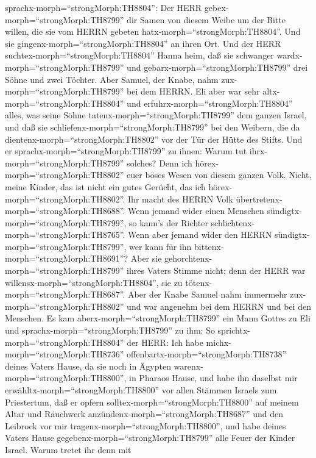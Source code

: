 sprachx-morph=``strongMorph:TH8804'': Der HERR
gebex-morph=``strongMorph:TH8799'' dir Samen von diesem Weibe um der
Bitte willen, die sie vom HERRN gebeten
hatx-morph=``strongMorph:TH8804''. Und sie
gingenx-morph=``strongMorph:TH8804'' an ihren Ort.  Und der
HERR suchtex-morph=``strongMorph:TH8804'' Hanna heim, daß sie schwanger
wardx-morph=``strongMorph:TH8799'' und
gebarx-morph=``strongMorph:TH8799'' drei Söhne und zwei Töchter. Aber
Samuel, der Knabe, nahm zux-morph=``strongMorph:TH8799'' bei dem HERRN.
 Eli aber war sehr altx-morph=``strongMorph:TH8804'' und
erfuhrx-morph=``strongMorph:TH8804'' alles, was seine Söhne
tatenx-morph=``strongMorph:TH8799'' dem ganzen Israel, und daß sie
schliefenx-morph=``strongMorph:TH8799'' bei den Weibern, die da
dientenx-morph=``strongMorph:TH8802'' vor der Tür der Hütte des Stifts.
 Und er sprachx-morph=``strongMorph:TH8799'' zu ihnen:
Warum tut ihrx-morph=``strongMorph:TH8799'' solches? Denn ich
hörex-morph=``strongMorph:TH8802'' euer böses Wesen von diesem ganzen
Volk.  Nicht, meine Kinder, das ist nicht ein gutes
Gerücht, das ich hörex-morph=``strongMorph:TH8802''. Ihr macht des HERRN
Volk übertretenx-morph=``strongMorph:TH8688''.  Wenn jemand
wider einen Menschen sündigtx-morph=``strongMorph:TH8799'', so kann's
der Richter schlichtenx-morph=``strongMorph:TH8765''. Wenn aber jemand
wider den HERRN sündigtx-morph=``strongMorph:TH8799'', wer kann für ihn
bittenx-morph=``strongMorph:TH8691''? Aber sie
gehorchtenx-morph=``strongMorph:TH8799'' ihres Vaters Stimme nicht; denn
der HERR war willensx-morph=``strongMorph:TH8804'', sie zu
tötenx-morph=``strongMorph:TH8687''.  Aber der Knabe Samuel
nahm immermehr zux-morph=``strongMorph:TH8802'' und war angenehm bei dem
HERRN und bei den Menschen.  Es kam
aberx-morph=``strongMorph:TH8799'' ein Mann Gottes zu Eli und
sprachx-morph=``strongMorph:TH8799'' zu ihm: So
sprichtx-morph=``strongMorph:TH8804'' der HERR: Ich habe
michx-morph=``strongMorph:TH8736''
offenbartx-morph=``strongMorph:TH8738'' deines Vaters Hause, da sie noch
in Ägypten warenx-morph=``strongMorph:TH8800'', in Pharaos Hause,
 und habe ihn daselbst mir
erwähltx-morph=``strongMorph:TH8800'' vor allen Stämmen Israels zum
Priestertum, daß er opfern solltex-morph=``strongMorph:TH8800'' auf
meinem Altar und Räuchwerk anzündenx-morph=``strongMorph:TH8687'' und
den Leibrock vor mir tragenx-morph=``strongMorph:TH8800'', und habe
deines Vaters Hause gegebenx-morph=``strongMorph:TH8799'' alle Feuer der
Kinder Israel.  Warum tretet ihr denn mit
